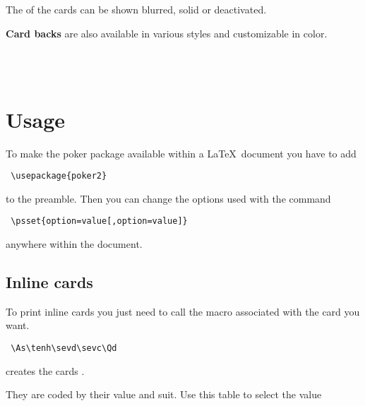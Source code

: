 \documentclass[11pt,english,BCOR10mm,DIV12,bibliography=totoc,parskip=false,smallheadings,
    headexclude,footexclude,oneside]{pst-doc}
\begin{document}
The  of the cards can be shown blurred, solid or deactivated.

\begin{LTXexample}[pos=t]
\crdAs
{}\crdtenh
{}\crdsevd
{}\crdsevc
{}\crdQd
\end{LTXexample}


\textbf{Card backs} are also available in various styles and customizable in color.

\begin{LTXexample}[pos=t]
\crdback
{}\crdback
{}\crdback
{}\crdback\\
\crdback
{}\crdback
{}\crdback
{}\crdback\\
\end{LTXexample}


\newpage
\section{Usage}
To make the poker package available within a \LaTeX\ document you have to add
\begin{verbatim}
 \usepackage{poker2}
\end{verbatim}
to the preamble. Then you can change the options used with the command
\begin{verbatim}
 \psset{option=value[,option=value]}
\end{verbatim}
anywhere within the document.

\subsection{Inline cards}
To print inline cards you just need to call the macro associated with the card you want.
\begin{verbatim}
 \As\tenh\sevd\sevc\Qd
\end{verbatim}
creates the cards \As\tenh\sevd\sevc\Qd.

They are coded by their value and suit. Use this table to select the value
\end{document}
